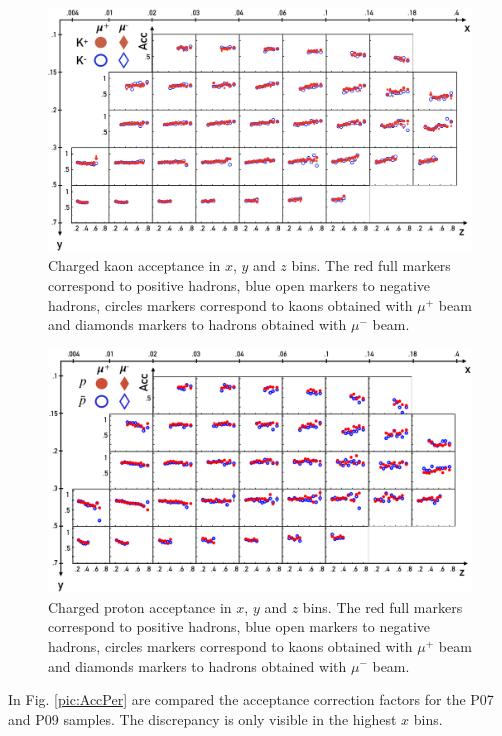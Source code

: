 \begin{figure}
  \centering
	\includegraphics[scale=0.6]{./gfx/AccK.png}
	\caption{Charged kaon acceptance in $x$, $y$ and $z$ bins. The red full markers correspond to positive hadrons, blue open markers to negative hadrons, circles markers correspond to kaons obtained with $\mu^+$ beam and diamonds markers to hadrons obtained with $\mu^-$ beam.}
	\label{pic:AccK}
\end{figure}

\begin{figure}
  \centering
	\includegraphics[scale=0.5]{./gfx/AccP.png}
	\caption{Charged proton acceptance in $x$, $y$ and $z$ bins. The red full markers correspond to positive hadrons, blue open markers to negative hadrons, circles markers correspond to kaons obtained with $\mu^+$ beam and diamonds markers to hadrons obtained with $\mu^-$ beam.}
	\label{pic:AccP}
\end{figure}

In Fig. \ref{pic:AccPer} are compared the acceptance correction factors for the P07 and P09 samples. The discrepancy is only visible in the highest $x$ bins.

